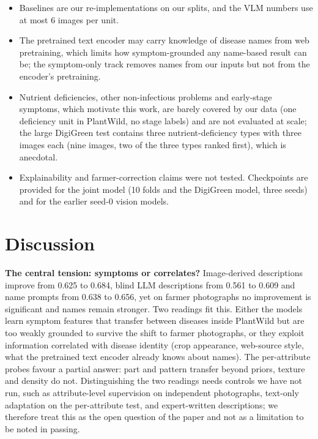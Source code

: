 \documentclass[11pt]{article}
\begin{document}
\begin{itemize}
\item Baselines are our re-implementations on our splits, and the VLM numbers use at most 6 images per unit.
\item The pretrained text encoder may carry knowledge of disease names from web pretraining, which limits how symptom-grounded any name-based result can be; the symptom-only track removes names from our inputs but not from the encoder's pretraining.
\item Nutrient deficiencies, other non-infectious problems and early-stage symptoms, which motivate this work, are barely covered by our data (one deficiency unit in PlantWild, no stage labels) and are not evaluated at scale; the large DigiGreen test contains three nutrient-deficiency types with three images each (nine images, two of the three types ranked first), which is anecdotal.
\item Explainability and farmer-correction claims were not tested. Checkpoints are provided for the joint model (10 folds and the DigiGreen model, three seeds) and for the earlier seed-0 vision models.
\end{itemize}

\section{Discussion}\label{sec:disc}
\textbf{The central tension: symptoms or correlates?} Image-derived descriptions improve from 0.625 to 0.684, blind LLM descriptions from 0.561 to 0.609 and name prompts from 0.638 to 0.656, yet on farmer photographs no improvement is significant and names remain stronger. Two readings fit this. Either the models learn symptom features that transfer between diseases inside PlantWild but are too weakly grounded to survive the shift to farmer photographs, or they exploit information correlated with disease identity (crop appearance, web-source style, what the pretrained text encoder already knows about names). The per-attribute probes favour a partial answer: part and pattern transfer beyond priors, texture and density do not. Distinguishing the two readings needs controls we have not run, such as attribute-level supervision on independent photographs, text-only adaptation on the per-attribute test, and expert-written descriptions; we therefore treat this as the open question of the paper and not as a limitation to be noted in passing.
\end{document}

